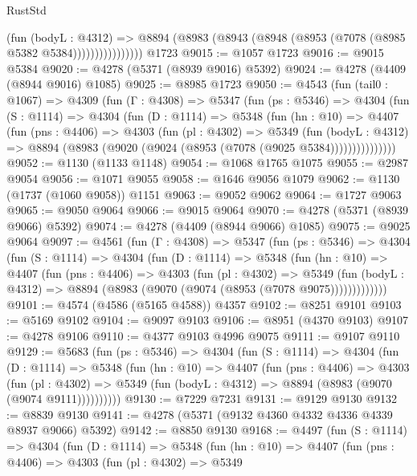 \begin{lexlean}{RustStd}
\begin{coremodule}
{\begin{coremodule}
{{{{{{{{{{{{{{{{{{{{{{{{{{{{{{{{{{{                      (fun (bodyL : @4312) =>
                      @8894 (@8983 (@8943 (@8948 (@8953 (@7078 (@8985 @5382 @5384))))))))))))))))
    @1723
@9015 := @1057 @1723
@9016 := @9015 @5384
@9020 := @4278 (@5371 (@8939 @9016) @5392)
@9024 := @4278 (@4409 (@8944 @9016) @1085)
@9025 := @8985 @1723
@9050 := @4543
    (fun (tail0 : @1067) =>
    @4309
      (fun (Γ : @4308) =>
      @5347
        (fun (ps : @5346) =>
        @4304
          (fun (S : @1114) =>
          @4304
            (fun (D : @1114) =>
            @5348
              (fun (hn : @10) =>
              @4407
                (fun (pns : @4406) =>
                @4303
                  (fun (pl : @4302) =>
                  @5349
                    (fun (bodyL : @4312) =>
                    @8894 (@8983 (@9020 (@9024 (@8953 (@7078 (@9025 @5384)))))))))))))))
@9052 := @1130 (@1133 @1148)
@9054 := @1068 @1765 @1075
@9055 := @2987 @9054
@9056 := @1071 @9055
@9058 := @1646 @9056 @1079
@9062 := @1130 (@1737 (@1060 @9058)) @1151
@9063 := @9052 @9062
@9064 := @1727 @9063
@9065 := @9050 @9064
@9066 := @9015 @9064
@9070 := @4278 (@5371 (@8939 @9066) @5392)
@9074 := @4278 (@4409 (@8944 @9066) @1085)
@9075 := @9025 @9064
@9097 := @4561
    (fun (Γ : @4308) =>
    @5347
      (fun (ps : @5346) =>
      @4304
        (fun (S : @1114) =>
        @4304
          (fun (D : @1114) =>
          @5348
            (fun (hn : @10) =>
            @4407
              (fun (pns : @4406) =>
              @4303
                (fun (pl : @4302) =>
                @5349
                  (fun (bodyL : @4312) =>
                  @8894 (@8983 (@9070 (@9074 (@8953 (@7078 @9075)))))))))))))
@9101 := @4574 (@4586 (@5165 @4588)) @4357
@9102 := @8251 @9101
@9103 := @5169 @9102
@9104 := @9097 @9103
@9106 := @8951 (@4370 @9103)
@9107 := @4278 @9106
@9110 := @4377 @9103 @4996 @9075
@9111 := @9107 @9110
@9129 := @5683
    (fun (ps : @5346) =>
    @4304
      (fun (S : @1114) =>
      @4304
        (fun (D : @1114) =>
        @5348
          (fun (hn : @10) =>
          @4407
            (fun (pns : @4406) =>
            @4303
              (fun (pl : @4302) =>
              @5349 (fun (bodyL : @4312) => @8894 (@8983 (@9070 (@9074 @9111))))))))))
@9130 := @7229 @7231
@9131 := @9129 @9130
@9132 := @8839 @9130
@9141 := @4278 (@5371 (@9132 @4360 @4332 @4336 @4339 @8937 @9066) @5392)
@9142 := @8850 @9130
@9168 := @4497
    (fun (S : @1114) =>
    @4304
      (fun (D : @1114) =>
      @5348
        (fun (hn : @10) =>
        @4407
          (fun (pns : @4406) =>
          @4303
            (fun (pl : @4302) =>
            @5349
}}}}}}}}}}}}}}}}}}}}}}}}}}}}}}}}}}}
\end{coremodule}}
\end{coremodule}
\end{lexlean}

